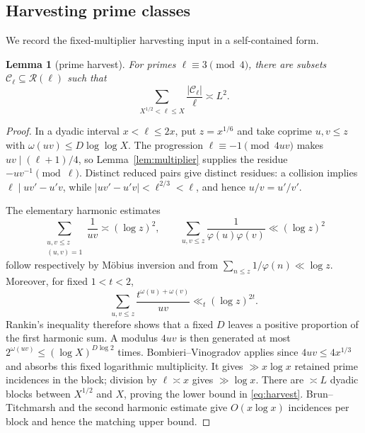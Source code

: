 \documentclass[10pt,reqno]{amsart}
\newtheorem{lemma}[theorem]{Lemma}
\theoremstyle{definition}
\newcommand{\Rcal}{\mathscr R}
\newcommand{\1}{\mathbf 1}
\begin{document}
\subsection{Harvesting prime classes}
We record the fixed-multiplier harvesting input in a self-contained form.
\begin{lemma}[prime harvest]\label{lem:prime-harvest}
For primes $\ell\equiv3\pmod4$, there are subsets $\mathcal C_\ell\subseteq\Rcal(\ell)$ such that
\begin{equation}\label{eq:harvest}
 \sum_{X^{1/2}<\ell\leq X}\frac{|\mathcal C_\ell|}{\ell}\asymp L^2.
\end{equation}
\end{lemma}
\begin{proof}
In a dyadic interval $x<\ell\leq2x$, put $z=x^{1/6}$ and take coprime $u,v\leq z$ with $\omega(uv)\leq D\log\log X$.  The progression
$\ell\equiv-1\pmod{4uv}$ makes $uv\mid(\ell+1)/4$, so Lemma~\ref{lem:multiplier} supplies the residue $-uv^{-1}\pmod\ell$.  Distinct reduced pairs give distinct residues: a collision implies
$\ell\mid uv'-u'v$, while $|uv'-u'v|<\ell^{2/3}<\ell$, and hence $u/v=u'/v'$.

The elementary harmonic estimates
\[
 \sum_{\substack{u,v\leq z\\(u,v)=1}}\frac1{uv}\asymp(\log z)^2,
 \qquad
 \sum_{u,v\leq z}\frac1{\varphi(u)\varphi(v)}\ll(\log z)^2
\]
follow respectively by M\"obius inversion and from $\sum_{n\leq z}1/\varphi(n)\ll\log z$.  Moreover, for fixed $1<t<2$,
\[
 \sum_{u,v\leq z}\frac{t^{\omega(u)+\omega(v)}}{uv}
 \ll_t(\log z)^{2t}.
\]
Rankin's inequality therefore shows that a fixed $D$ leaves a positive proportion of the first harmonic sum.  A modulus $4uv$ is then generated at most $2^{\omega(uv)}\leq(\log X)^{D\log2}$ times.  Bombieri--Vinogradov applies since $4uv\leq4x^{1/3}$ and absorbs this fixed logarithmic multiplicity.  It gives $\gg x\log x$ retained prime incidences in the block; division by $\ell\asymp x$ gives $\gg\log x$.  There are $\asymp L$ dyadic blocks between $X^{1/2}$ and $X$, proving the lower bound in \eqref{eq:harvest}.  Brun--Titchmarsh and the second harmonic estimate give $O(x\log x)$ incidences per block and hence the matching upper bound.
\end{proof}
\end{document}
